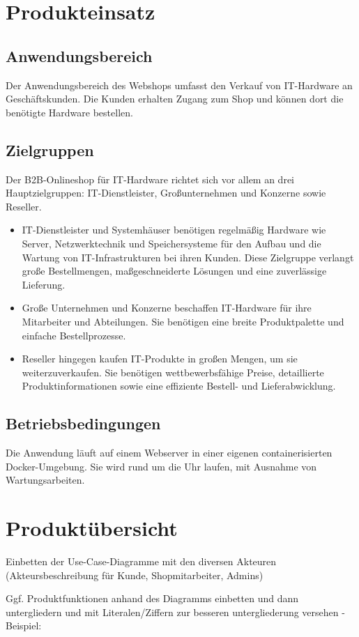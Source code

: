 \documentclass[%
	ngerman,
	12pt,
	a4paper,
	oneside,
	parskip=full
]{scrbook}
\begin{document}
\chapter{Produkteinsatz}
\section{Anwendungsbereich}
Der Anwendungsbereich des Webshops umfasst den Verkauf von IT-Hardware an Geschäftskunden.
Die Kunden erhalten Zugang zum Shop und können dort die benötigte Hardware bestellen.
\section{Zielgruppen}
Der B2B-Onlineshop für IT-Hardware richtet sich vor allem an drei Hauptzielgruppen:
IT-Dienstleister, Großunternehmen und Konzerne sowie Reseller.
\begin{itemize}
	\item IT-Dienstleister und Systemhäuser benötigen regelmäßig Hardware wie Server, Netzwerktechnik und Speichersysteme für den Aufbau und die Wartung von IT-Infrastrukturen bei ihren Kunden.
	Diese Zielgruppe verlangt große Bestellmengen, maßgeschneiderte Lösungen und eine zuverlässige Lieferung.
	\item Große Unternehmen und Konzerne beschaffen IT-Hardware für ihre Mitarbeiter und Abteilungen.
	Sie benötigen eine breite Produktpalette und einfache Bestellprozesse.
	\item Reseller hingegen kaufen IT-Produkte in großen Mengen, um sie weiterzuverkaufen.
	Sie benötigen wettbewerbsfähige Preise, detaillierte Produktinformationen sowie eine effiziente Bestell- und Lieferabwicklung.
\end{itemize}
\section{Betriebsbedingungen}
Die Anwendung läuft auf einem Webserver in einer eigenen containerisierten Docker-Umgebung.
Sie wird rund um die Uhr laufen, mit Ausnahme von Wartungsarbeiten.

\chapter{Produktübersicht}
Einbetten der Use-Case-Diagramme mit den diversen Akteuren (Akteursbeschreibung für Kunde, Shopmitarbeiter, Admins)

Ggf. Produktfunktionen anhand des Diagramms einbetten und dann untergliedern und mit Literalen/Ziffern zur besseren untergliederung versehen -
Beispiel:
\end{document}

